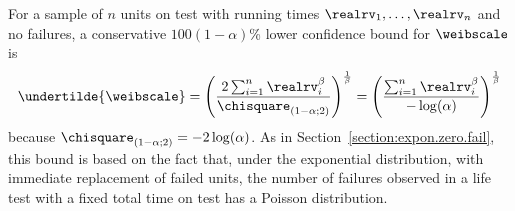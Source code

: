 For a sample of $n$ units on test with running times
$\realrv_{1},\dots,\realrv_{n}$ and no failures, a conservative
$100(1-\alpha)$\% lower confidence bound for $\weibscale$ is
\begin{equation}
\label{equation:zero.failures.weib.ci}
\undertilde{\weibscale} = \left( \frac{2 \sum_{i=1}^{n} \realrv_{i}^{\beta}}{
\chisquare_{(1-\alpha;2)}} \right)^{\frac{1}{\beta}}
= \left( \frac{ \sum_{i=1}^{n} \realrv_{i}^{\beta}} { -\log(\alpha)} \right)^{\frac{1}{\beta}}
\end{equation}
because $ \chisquare_{(1-\alpha;2)} = - 2 \log(\alpha) $.
As in Section~\ref{section:expon.zero.fail}, this bound is based on
the fact that, under the exponential distribution,
with immediate replacement of failed units, the number of
failures observed in a life test with a fixed total time on test
has a Poisson distribution.

